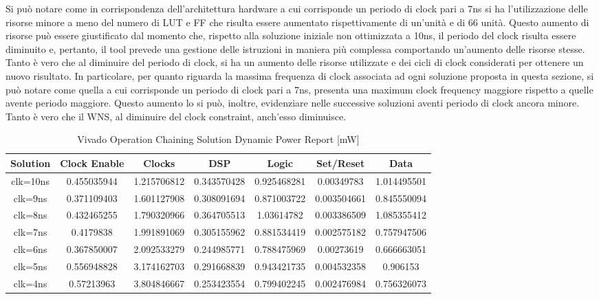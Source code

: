 Si può notare come in corrispondenza dell'architettura hardware a cui corrisponde un periodo di clock pari a 7ns si ha l'utilizzazione delle risorse minore a meno del numero di LUT e FF che risulta essere aumentato rispettivamente di un'unità e di 66 unità. Questo aumento di risorse può essere giustificato dal momento che, rispetto alla soluzione iniziale non ottimizzata a 10ns, il periodo del clock risulta essere diminuito e, pertanto, il tool prevede una gestione delle istruzioni in maniera più complessa comportando un'aumento delle risorse stesse. Tanto è vero che al diminuire del periodo di clock, si ha un aumento delle risorse utilizzate e dei cicli di clock considerati per ottenere un nuovo risultato. In particolare, per quanto riguarda la massima frequenza di clock associata ad ogni soluzione proposta in questa sezione, si può notare come quella a cui corrisponde un periodo di clock pari a 7ns, presenta una maximum clock frequency maggiore rispetto a quelle avente periodo maggiore. Questo aumento lo si può, inoltre, evidenziare nelle successive soluzioni aventi periodo di clock ancora minore. Tanto è vero che il WNS, al diminuire del clock constraint, anch'esso diminuisce.

\begin{table}[H]
    \centering
    \begin{tabular}{|c|c|c|c|c|c|c|}
        \hline
        \textbf{Solution} & \textbf{Clock Enable} & \textbf{Clocks} & \textbf{DSP} & \textbf{Logic} & \textbf{Set/Reset} & \textbf{Data} \\
        \hline
        clk=10ns & 0.455035944 & 1.215706812 & 0.343570428 & 0.925468281 & 0.00349783 & 1.014495501 \\
        \hline
        clk=9ns & 0.371109403 & 1.601127908 & 0.308091694 & 0.871003722 & 0.003504661 & 0.845550094 \\
        \hline
        clk=8ns & 0.432465255 & 1.790320966 & 0.364705513 & 1.03614782 & 0.003386509 & 1.085355412 \\
        \hline
        clk=7ns & 0.4179838 & 1.991891069 & 0.305155962 & 0.881534419 & 0.002575182 & 0.757947506 \\
        \hline
        clk=6ns & 0.367850007 & 2.092533279 & 0.244985771 & 0.788475969 & 0.00273619 & 0.666663051 \\
        \hline
        clk=5ns & 0.556948828 & 3.174162703 & 0.291668839 & 0.943421735 & 0.004532358 & 0.906153 \\
        \hline
        clk=4ns & 0.57213963 & 3.804846667 & 0.253423554 & 0.799402245 & 0.002476984 & 0.756326073 \\
        \hline
    \end{tabular}
    \caption{Vivado Operation Chaining Solution Dynamic Power Report [mW]}
    \label{tab:vivado-operation-chaining-solution-dynamic-power-reproot}
\end{table}

